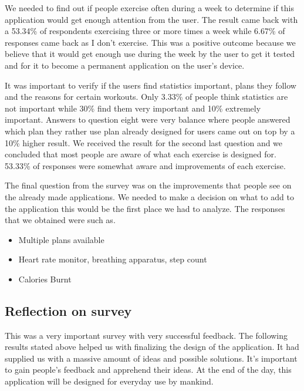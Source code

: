 \documentclass[a4paper,12pt]{report}
\begin{document}
We needed to find out if people exercise often during a week to determine if this application would get enough attention from the user.
The result came back with a 53.34\% of respondents exercising three or more times a week while 6.67\% of responses came back as I don't exercise. 
This was a positive outcome because we believe that it would get enough use during the week by the user to get it tested and for it to become a permanent application on the user's device.

It was important to verify if the users find statistics important, plans they follow and the reasons for certain workouts.
Only 3.33\% of people think statistics are not important while 30\% find them very important and 10\% extremely important.
Answers to question eight were very balance where people answered which plan they rather use plan already designed for users came out on top by a 10\% higher result.
We received the result for the second last question and we concluded that most people are aware of what each exercise is designed for. 53.33\% of responses were somewhat aware and improvements of each exercise.

The final question from the survey was on the improvements that people see on the already made applications.
We needed to make a decision on what to add to the application this would be the first place we had to analyze.
The responses that we obtained were such as.
\begin{itemize}
    \item  Multiple plans available
    \item Heart rate monitor, breathing apparatus, step count
    \item Calories Burnt 
\end{itemize}
   
\subsection{Reflection on survey} 
This was a very important survey with very successful feedback. The following results stated above helped us with finalizing the design of the application.
It had supplied us with a massive amount of ideas and possible solutions. It's important to gain people's feedback and apprehend their ideas. At the end of the day, this application will be designed for everyday use by mankind.
\end{document}
